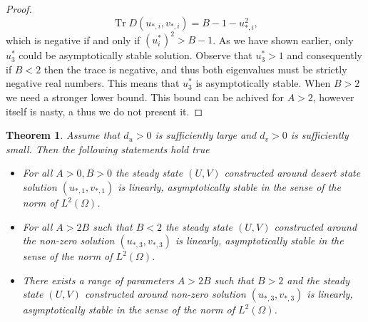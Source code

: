 \documentclass[12pt, a4paper]{article}
\theoremstyle{break}
\newtheorem{thm}{Theorem}[section]
\theoremstyle{break}
\theoremstyle{break}
\theoremstyle{break}
\theoremstyle{break}
\theoremstyle{break}
\theoremstyle{break}
\DeclareMathOperator{\Tr}{Tr}
\begin{document}
\begin{proof}
    \begin{equation}
        \label{EQ:TraceLinearizationKinetic}
        \Tr D(u_{*,i}, v_{*,i}) = B - 1 - u_{*,i}^2,
    \end{equation}
    which is negative if and only if $(u_i^*)^2 > B - 1$. As we have shown earlier, only $u_3^*$ could be asymptotically stable solution. Observe that $u_3^* > 1$ and consequently if $B < 2$ then the trace is negative, and thus both eigenvalues must be strictly negative real numbers. This means that $u_3^*$ is asymptotically stable. When $B > 2$ we need a stronger lower bound. This bound can be achived for $A > 2$, however itself is nasty, a thus we do not present it.
\end{proof}

\begin{thm}
    \label{thm:Stationary-Solutions-Stability}
    Assume that $d_u > 0$ is sufficiently large and $d_v > 0$ is sufficiently small. Then the following statements hold true
    \begin{itemize}
        \item For all $A > 0, B >0$ the steady state $(U, V)$ constructed around desert state solution $(u_{*,1}, v_{*,1})$ is linearly, asymptotically stable in the sense of the norm of $L^2(\Omega)$.
        \item For all $A > 2B$ such that $B < 2$ the steady state $(U, V)$ constructed around the non-zero solution $(u_{*,3}, v_{*,3})$ is linearly, asymptotically stable in the sense of the norm of $L^2(\Omega)$.
        \item There exists a range of parameters $A > 2B$ such that $B > 2$ and the steady state $(U, V)$ constructed around non-zero solution $(u_{*,3}, v_{*,3})$ is linearly, asymptotically stable in the sense of the norm of $L^2(\Omega)$.
    \end{itemize}
\end{thm}
\end{document}
